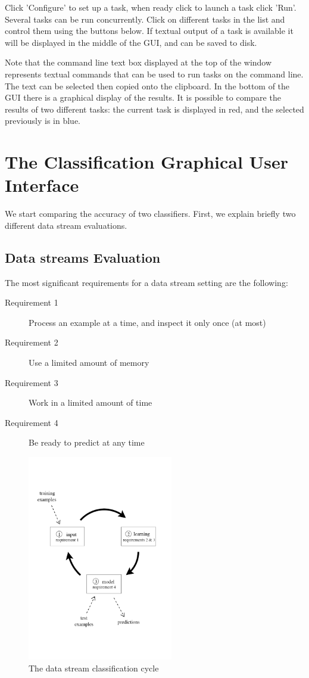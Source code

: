 \documentclass[a4paper,12pt]{article}
\begin{document}
Click 'Configure' to set up a task, when ready click to launch a task click 'Run'. Several tasks can be run concurrently. 
Click on different tasks in the list and control them using the buttons below.
 If textual output of a task is available it will be displayed in the middle of the GUI, and can be saved to disk.

Note that the command line text box displayed at the top of the window represents textual commands that can be used to run tasks on the command line.
 The text can be selected then copied onto the clipboard. In the bottom of the GUI there is a graphical display of the results. It is possible
to compare the results of two different tasks: the current task is displayed in red, and the selected previously is in blue. 

\section{The Classification Graphical User Interface}

We start comparing the accuracy of two classifiers. First, we explain briefly two different data stream evaluations.%

\subsection{Data streams Evaluation}
The most significant requirements for a data stream setting are the following: 
\begin{description}
\item[Requirement 1] Process an example at a time, and inspect
 it only once (at most)
\item[Requirement 2] Use a limited amount of memory
\item[Requirement 3] Work in a limited amount of time
\item[Requirement 4] Be ready to predict at any time
\end{description}
\begin{figure}[t]
\begin{center} 
\includegraphics[height=9cm]{images/Frame.pdf}
\end{center} 
\caption{The data stream classification cycle}
\label{fig:cycle}
\end{figure} 
\end{document}
